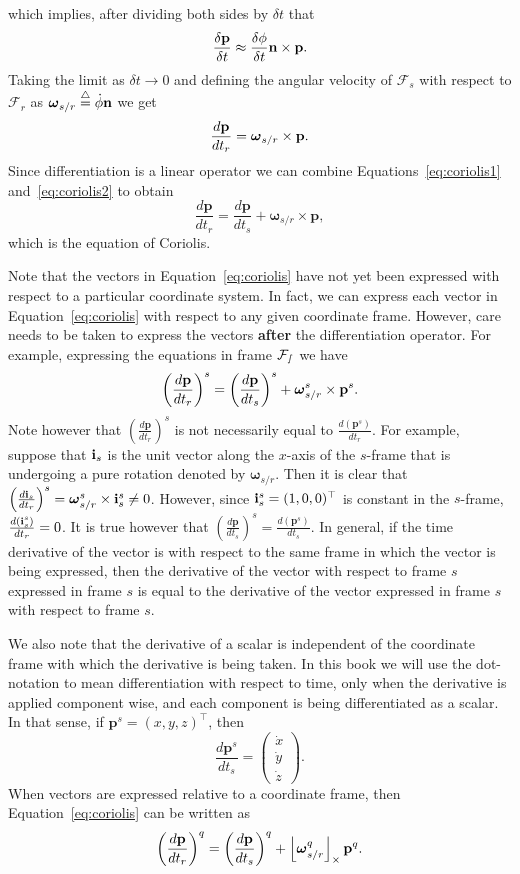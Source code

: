 which implies, after dividing both sides by $\delta t$ that
\[
\frac{\delta\mathbf{p}}{\delta t} \approx \frac{\delta\phi}{\delta
t}\mathbf{n} \times \mathbf{p}.
\]
Taking the limit as $\delta t \to 0$ and defining the angular
velocity of $\mathcal{F}_s$ with respect to $\mathcal{F}_r$ as
$\boldsymbol{\omega}_{s/r}
\stackrel{\triangle}{=} \dot{\phi}\mathbf{n}$ we get
\begin{equation}\label{eq:coriolis2}
\frac{d\mathbf{p}}{dt_r} = \omegabf_{s/r}\times\mathbf{p}.
\end{equation}
Since differentiation is a linear operator we can combine
Equations~\eqref{eq:coriolis1}
and~\eqref{eq:coriolis2} to obtain
\begin{equation}\label{eq:coriolis}
\frac{d\mathbf{p}}{dt_r} = \frac{d\mathbf{p}}{dt_s} + \boldsymbol{\omega}_{s/r}
\times\mathbf{p},
\end{equation}
which is the equation of Coriolis.

Note that the vectors in Equation~\eqref{eq:coriolis} have not yet been expressed with respect to a particular coordinate system.  In fact, we can express each vector in Equation~\eqref{eq:coriolis} with respect to any given coordinate frame.  However, care needs to be taken to express the vectors {\bf after} the differentiation operator. For example, expressing the equations in frame $\cal{F}_s$ we have 
\[
\left(\frac{d\mathbf{p}}{dt_r}\right)^s = \left(\frac{d\mathbf{p}}{dt_s}\right)^s + \boldsymbol{\omega}_{s/r}^s \times \mathbf{p}^s.
\]
Note however that $\left(\frac{d\mathbf{p}}{dt_r}\right)^s$ is not necessarily equal to $\frac{d\left(\mathbf{p}^s\right)}{dt_r}$.  For example, suppose that $\mathbf{i}_s$ is the unit vector along the $x$-axis of the $s$-frame that is undergoing a pure rotation denoted by $\boldsymbol{\omega}_{s/r}$.  Then it is clear that $\left(\frac{d\mathbf{i}_s}{dt_r}\right)^s = \boldsymbol{\omega}_{s/r}^s\times\mathbf{i}_s^s \neq 0$.  However, since $\mathbf{i}_s^s = (1, 0, 0)^\top$ is constant in the $s$-frame, $\frac{d\left(\mathbf{i}_s^s\right)}{dt_r}=0$.  
%
It is true however that $\left(\frac{d\mathbf{p}}{dt_s}\right)^s =  \frac{d\left(\mathbf{p}^s\right)}{dt_s}$. In general, if the time derivative of the vector is with respect to the same frame in which the vector is being expressed, then the derivative of the vector with respect to frame $s$ expressed in frame $s$ is equal to the derivative of the vector expressed in frame $s$ with respect to frame $s$. 


We also note that the derivative of a scalar is independent of the coordinate frame with which the derivative is being taken.  In this book we will use the dot-notation to mean differentiation with respect to time, only when the derivative is applied component wise, and each component is being differentiated as a scalar.  In that sense, if $\mathbf{p}^s = (x, y, z)^{\top}$, then 
\[
\frac{d\mathbf{p}^s}{dt_s} = \begin{pmatrix} \dot{x} \\ \dot{y} \\ \dot{z} \end{pmatrix}.
\]
When vectors are expressed relative to a coordinate frame, then Equation~\eqref{eq:coriolis} can be written as
\[
\left(\frac{d\mathbf{p}}{dt_r}\right)^q = \left(\frac{d\mathbf{p}}{dt_s}\right)^q+ \left\lfloor\boldsymbol{\omega}_{s/r}^q\right\rfloor_{\times}\mathbf{p}^q.
\]

